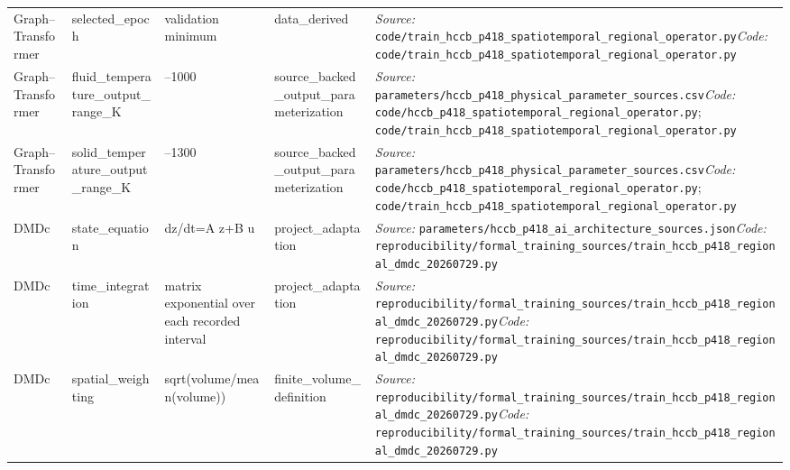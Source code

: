 \begin{longtable}{>{\raggedright\arraybackslash}p{2.7cm}>{\raggedright\arraybackslash}p{3.2cm}>{\raggedright\arraybackslash}p{1.5cm}>{\raggedright\arraybackslash}p{2.6cm}>{\raggedright\arraybackslash}p{8.0cm}}
Graph--Transformer & selected\_\allowbreak{}epoch & validation minimum & data\_\allowbreak{}derived & \textit{Source:} \nolinkurl{code/train_hccb_p418_spatiotemporal_regional_operator.py}\newline \textit{Code:} \nolinkurl{code/train_hccb_p418_spatiotemporal_regional_operator.py} \\
Graph--Transformer & fluid\_\allowbreak{}temperature\_\allowbreak{}output\_\allowbreak{}range\_\allowbreak{}K & 300--1000 & source\_\allowbreak{}backed\_\allowbreak{}output\_\allowbreak{}parameterization & \textit{Source:} \nolinkurl{parameters/hccb_p418_physical_parameter_sources.csv}\newline \textit{Code:} \nolinkurl{code/hccb_p418_spatiotemporal_regional_operator.py}; \nolinkurl{code/train_hccb_p418_spatiotemporal_regional_operator.py} \\
Graph--Transformer & solid\_\allowbreak{}temperature\_\allowbreak{}output\_\allowbreak{}range\_\allowbreak{}K & 298--1300 & source\_\allowbreak{}backed\_\allowbreak{}output\_\allowbreak{}parameterization & \textit{Source:} \nolinkurl{parameters/hccb_p418_physical_parameter_sources.csv}\newline \textit{Code:} \nolinkurl{code/hccb_p418_spatiotemporal_regional_operator.py}; \nolinkurl{code/train_hccb_p418_spatiotemporal_regional_operator.py} \\
DMDc & state\_\allowbreak{}equation & dz/\allowbreak{}dt=\allowbreak{}A z+B u & project\_\allowbreak{}adaptation & \textit{Source:} \nolinkurl{parameters/hccb_p418_ai_architecture_sources.json}\newline \textit{Code:} \nolinkurl{reproducibility/formal_training_sources/train_hccb_p418_regional_dmdc_20260729.py} \\
DMDc & time\_\allowbreak{}integration & matrix exponential over each recorded interval & project\_\allowbreak{}adaptation & \textit{Source:} \nolinkurl{reproducibility/formal_training_sources/train_hccb_p418_regional_dmdc_20260729.py}\newline \textit{Code:} \nolinkurl{reproducibility/formal_training_sources/train_hccb_p418_regional_dmdc_20260729.py} \\
DMDc & spatial\_\allowbreak{}weighting & sqrt(\allowbreak{}volume/\allowbreak{}mean(\allowbreak{}volume)) & finite\_\allowbreak{}volume\_\allowbreak{}definition & \textit{Source:} \nolinkurl{reproducibility/formal_training_sources/train_hccb_p418_regional_dmdc_20260729.py}\newline \textit{Code:} \nolinkurl{reproducibility/formal_training_sources/train_hccb_p418_regional_dmdc_20260729.py} \\

\end{longtable}
